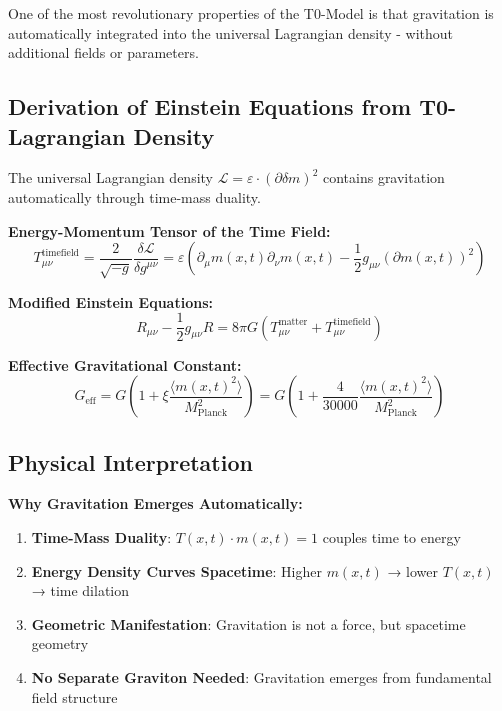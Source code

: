 \documentclass[12pt,a4paper]{report}
\newcommand{\Tfield}{T(x,t)}  %
\newcommand{\mfield}{m(x,t)}  %
\newcommand{\xipar}{\xi}      %
\begin{document}
One of the most revolutionary properties of the T0-Model is that gravitation is automatically integrated into the universal Lagrangian density - without additional fields or parameters.

\subsection{Derivation of Einstein Equations from T0-Lagrangian Density}\label{subsec:einstein_from_t0}

The universal Lagrangian density $\mathcal{L} = \varepsilon \cdot (\partial \delta m)^2$ contains gravitation automatically through time-mass duality.

\textbf{Energy-Momentum Tensor of the Time Field:}
\begin{equation}
	T_{\mu\nu}^{\text{timefield}} = \frac{2}{\sqrt{-g}} \frac{\delta \mathcal{L}}{\delta g^{\mu\nu}} = \varepsilon \left(\partial_\mu \mfield \partial_\nu \mfield - \frac{1}{2} g_{\mu\nu} (\partial \mfield)^2\right)
\end{equation}

\textbf{Modified Einstein Equations:}
\begin{equation}\label{eq:einstein_timefield_modified}
	R_{\mu\nu} - \frac{1}{2} g_{\mu\nu} R = 8\pi G \left(T_{\mu\nu}^{\text{matter}} + T_{\mu\nu}^{\text{timefield}}\right)
\end{equation}

\textbf{Effective Gravitational Constant:}
\begin{equation}
	G_{\text{eff}} = G \left(1 + \xipar \frac{\langle \mfield^2 \rangle}{M_{\text{Planck}}^2}\right) = G \left(1 + \frac{4}{30000} \frac{\langle \mfield^2 \rangle}{M_{\text{Planck}}^2}\right)
\end{equation}

\subsection{Physical Interpretation}\label{subsec:gravity_interpretation}

\textbf{Why Gravitation Emerges Automatically:}
\begin{enumerate}
	\item \textbf{Time-Mass Duality}: $\Tfield \cdot \mfield = 1$ couples time to energy
	\item \textbf{Energy Density Curves Spacetime}: Higher $\mfield$ → lower $\Tfield$ → time dilation
	\item \textbf{Geometric Manifestation}: Gravitation is not a force, but spacetime geometry
	\item \textbf{No Separate Graviton Needed}: Gravitation emerges from fundamental field structure
\end{enumerate}	
\end{document}
